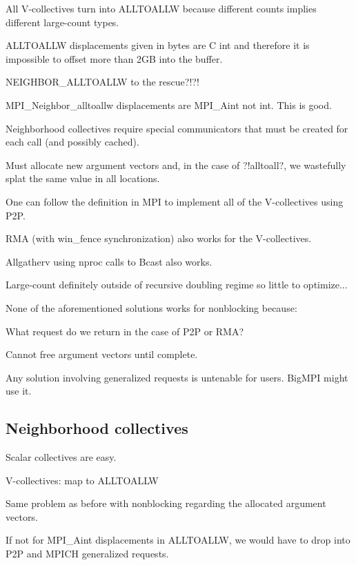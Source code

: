 All V-collectives turn into ALLTOALLW because different counts implies different large-count types.

ALLTOALLW displacements given in bytes are C int and therefore it is impossible to offset more than 2GB into the buffer.

NEIGHBOR\_ALLTOALLW to the rescue?!?!

MPI\_Neighbor\_alltoallw displacements are MPI\_Aint not int.  This is good.

Neighborhood collectives require special communicators that must be created for each call (and possibly cached).

Must allocate new argument vectors and, in the case of ?!alltoall?, we wastefully splat the same value in all locations.


One can follow the definition in MPI to implement all of the V-collectives using P2P.

RMA (with win\_fence synchronization) also works for the V-collectives.

Allgatherv using nproc calls to Bcast also works.

Large-count definitely outside of recursive doubling regime so little to optimize...


None of the aforementioned solutions works for nonblocking because:

What request do we return in the case of P2P or RMA?

Cannot free argument vectors until complete.

Any solution involving generalized requests is untenable for users.  BigMPI might use it.

\subsection{Neighborhood collectives}

Scalar collectives are easy.

V-collectives: map to ALLTOALLW

Same problem as before with nonblocking regarding the allocated argument vectors.

If not for MPI\_Aint displacements in ALLTOALLW, we would have to drop into P2P and MPICH generalized requests.
